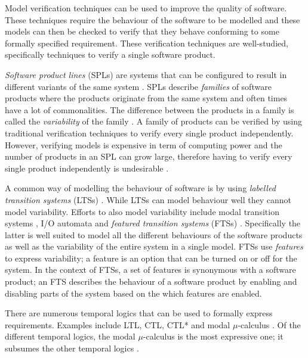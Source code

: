 Model verification techniques can be used to improve the quality of software. These techniques require the behaviour of the software to be modelled and these models can then be checked to verify that they behave conforming to some formally specified requirement. These verification techniques are well-studied, specifically techniques to verify a single software product.

\textit{Software product lines} (SPLs) are systems that can be configured to result in different variants of the same system \cite{ClementsSoftwareProduct2001,SPLsFoundationAndTechniques}. SPLs describe \textit{families} of software products where the products originate from the same system and often times have a lot of commonalities. The difference between the products in a family is called the \textit{variability} of the family \cite{OnTheNotionOfVariability}. A family of products can be verified by using traditional verification techniques to verify every single product independently. However, verifying models is expensive in term of computing power and the number of products in an SPL can grow large, therefore having to verify every single product independently is undesirable \cite{CheckingLotsOfSystems}.

A common way of modelling the behaviour of software is by using \textit{labelled transition systems} (LTSs) \cite{Groote}. While LTSs can model behaviour well they cannot model variability. Efforts to also model variability include  modal transition systems \cite{ModalTS1,ModalTS2,ModalTS3}, I/O automata \cite{ModalIOAutomata,ModelCheckingDomainArtifacts} and \textit{featured transition systems} (FTSs) \cite{CheckingLotsOfSystems,FTSLTL}. Specifically the latter is well suited to model all the different behaviours of the software products as well as the variability of the entire system in a single model. FTSs use \textit{features} to express variability; a feature is an option that can be turned on or off for the system. In the context of FTSs, a set of features is synonymous with a software product; an FTS describes the behaviour of a software product by enabling and disabling parts of the system based on the which features are enabled.

There are numerous temporal logics that can be used to formally express requirements. Examples include LTL, CTL, CTL* and modal $\mu$-calculus \cite{LTL,PrinciplesOfModelChecking,Groote}. Of the different temporal logics, the modal $\mu$-calculus is the most expressive one; it subsumes the other temporal logics \cite{MuCalculusSubsumes}. 

